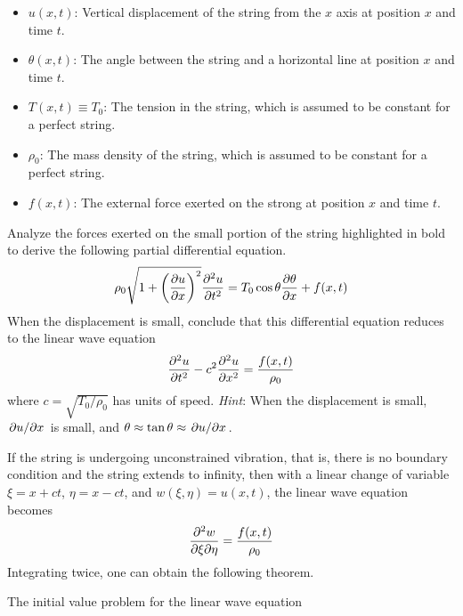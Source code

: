 \documentclass[../psets.tex]{subfiles}
\begin{document}
\begin{enumerate}
\begin{center}
    \end{center}
    \begin{itemize}
        \item $u(x,t)$: Vertical displacement of the string from the $x$ axis at position $x$ and time $t$.
        \item $\theta(x,t)$: The angle between the string and a horizontal line at position $x$ and time $t$.
        \item $T(x,t)\equiv T_0$: The tension in the string, which is assumed to be constant for a perfect string.
        \item $\rho_0$: The mass density of the string, which is assumed to be constant for a perfect string.
        \item $f(x,t)$: The external force exerted on the strong at position $x$ and time $t$.
    \end{itemize}
    Analyze the forces exerted on the small portion of the string highlighted in bold to derive the following partial differential equation.
    \begin{equation*}
        \rho_0\sqrt{1+\left( \pdv{u}{x} \right)^2}\pdv[2]{u}{t} = T_0\cos\theta\pdv{\theta}{x}+f(x,t)
    \end{equation*}
    When the displacement is small, conclude that this differential equation reduces to the linear wave equation
    \begin{equation*}
        \pdv[2]{u}{t}-c^2\pdv[2]{u}{x} = \frac{f(x,t)}{\rho_0}
    \end{equation*}
    where $c=\sqrt{T_0/\rho_0}$ has units of speed. \emph{Hint}: When the displacement is small, $\pdv*{u}{x}$ is small, and $\theta\approx\tan\theta\approx\pdv*{u}{x}$.\par
    If the string is undergoing unconstrained vibration, that is, there is no boundary condition and the string extends to infinity, then with a linear change of variable $\xi=x+ct$, $\eta=x-ct$, and $w(\xi,\eta)=u(x,t)$, the linear wave equation becomes
    \begin{equation*}
        \pdv{w}{\xi}{\eta} = \frac{f(x,t)}{\rho_0}
    \end{equation*}
    Integrating twice, one can obtain the following theorem.
    \begin{theorem}[d'Alembert]
        The initial value problem for the linear wave equation
        \begin{gather*}

\end{gather*}
\end{theorem}
\end{enumerate}
\end{document}
